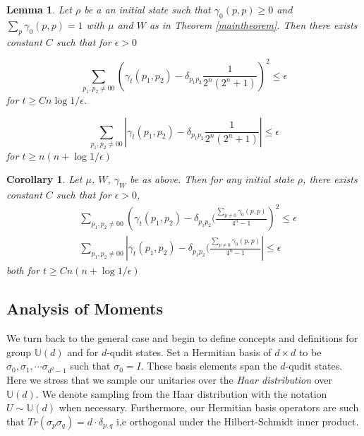 \documentclass[12pt]{amsart}
\newtheorem{corollary}{Corollary}[theorem]
\newtheorem{lemma}[theorem]{Lemma}
\theoremstyle{definition}
\theoremstyle{remark}
\numberwithin{equation}{section}
\theoremstyle{remark}
\begin{document}
\begin{lemma} \label{mainlemma}
  Let $\rho$ be a an initial state such that $\gamma_0(p,p) \geq 0$ and $\sum_{p} \gamma_0(p,p) = 1$ with $\mu$ and $W$ as in Theorem \ref{maintheorem}. Then there exists constant $C$ such that for $\epsilon > 0$

  \begin{equation}
    \sum_{p_1,p_2 \neq 00} \left( \gamma_t(p_1,p_2) - \delta_{p_1p_2} \frac{1}{2^n(2^n + 1)} \right)^2 \leq \epsilon
  \end{equation}
  for $t \geq Cn\log 1/\epsilon$.

  \begin{equation}
    \sum_{p_1,p_2 \neq 00} \left| \gamma_t(p_1,p_2) - \delta_{p_1p_2} \frac{1}{2^n(2^n + 1)} \right| \leq \epsilon
  \end{equation}
  for $t \geq n(n + \log 1/\epsilon)$
\end{lemma}

\begin{corollary} \label{maincorollary}
  Let $\mu$, $W$, $\gamma_W$ be as above. Then for \emph{any} initial state $\rho$, there exists constant $C$ such that for $\epsilon > 0$,
  \begin{align}
    & \sum_{p_1,p_2 \neq 00} \left( \gamma_t(p_1,p_2) - \delta_{p_1p_2}(\frac{\sum_{p\neq 0} \gamma_0(p,p)}{4^n - 1} \right)^2 \leq \epsilon \\
    & \sum_{p_1,p_2 \neq 00} \left| \gamma_t(p_1,p_2) - \delta_{p_1p_2}(\frac{\sum_{p\neq 0} \gamma_0(p,p)}{4^n - 1} \right| \leq \epsilon
  \end{align}
  both for $t \geq Cn(n + \log 1/ \epsilon)$
\end{corollary}

\subsection{Analysis of Moments}

We turn back to the general case and begin to define concepts and definitions for group $\mathbb{U}(d)$ and for $d$-qudit states. Set a Hermitian basis of $d \times d$ to be $\sigma_0,\sigma_1,\cdots \sigma_{d^2 -1}$ such that $\sigma_0 = I$. These basis elements span the $d$-qudit states. Here we stress that we sample our unitaries over the \emph{Haar distribution} over $\mathbb{U}(d)$. We denote sampling from the Haar distribution with the notation $U \sim \mathbb{U}(d)$ when necessary. Furthermore, our Hermitian basis operators are such that $Tr(\sigma_p\sigma_q) = d \cdot \delta_{p,q}$ i,e orthogonal under the Hilbert-Schmidt inner product. \newline
\end{document}
